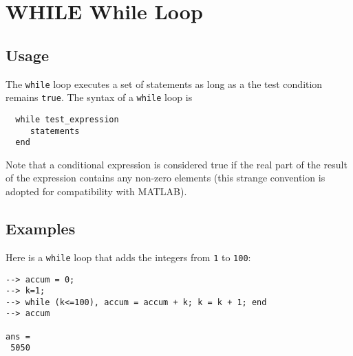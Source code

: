 \section{WHILE While Loop}

\subsection{Usage}

The \verb|while| loop executes a set of statements as long as
a the test condition remains \verb|true|.  The syntax of a 
\verb|while| loop is
\begin{verbatim}
  while test_expression
     statements
  end
\end{verbatim}
Note that a conditional expression is considered true if 
the real part of the result of the expression contains
any non-zero elements (this strange convention is adopted
for compatibility with MATLAB).
\subsection{Examples}

Here is a \verb|while| loop that adds the integers from \verb|1|
to \verb|100|:
\begin{verbatim}
--> accum = 0;
--> k=1;
--> while (k<=100), accum = accum + k; k = k + 1; end
--> accum

ans = 
 5050 
\end{verbatim}
